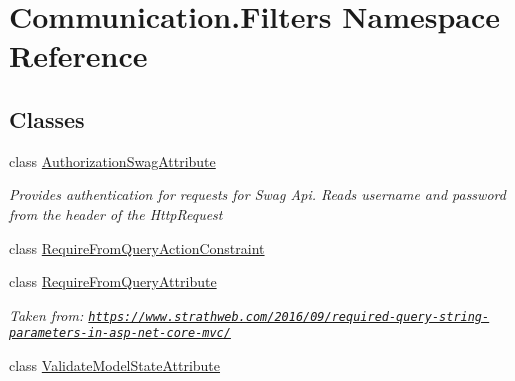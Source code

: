 \hypertarget{namespace_communication_1_1_filters}{}\section{Communication.\+Filters Namespace Reference}
\label{namespace_communication_1_1_filters}
\subsection*{Classes}
\begin{DoxyCompactItemize}
\item 
class \mbox{\hyperlink{class_communication_1_1_filters_1_1_authorization_swag_attribute}{Authorization\+Swag\+Attribute}}
\begin{DoxyCompactList}\small\item\em Provides authentication for requests for Swag Api. Reads username and password from the header of the Http\+Request \end{DoxyCompactList}\item 
class \mbox{\hyperlink{class_communication_1_1_filters_1_1_require_from_query_action_constraint}{Require\+From\+Query\+Action\+Constraint}}
\item 
class \mbox{\hyperlink{class_communication_1_1_filters_1_1_require_from_query_attribute}{Require\+From\+Query\+Attribute}}
\begin{DoxyCompactList}\small\item\em Taken from\+: \href{https://www.strathweb.com/2016/09/required-query-string-parameters-in-asp-net-core-mvc/}{\tt https\+://www.\+strathweb.\+com/2016/09/required-\/query-\/string-\/parameters-\/in-\/asp-\/net-\/core-\/mvc/} \end{DoxyCompactList}\item 
class \mbox{\hyperlink{class_communication_1_1_filters_1_1_validate_model_state_attribute}{Validate\+Model\+State\+Attribute}}
\end{DoxyCompactItemize}
